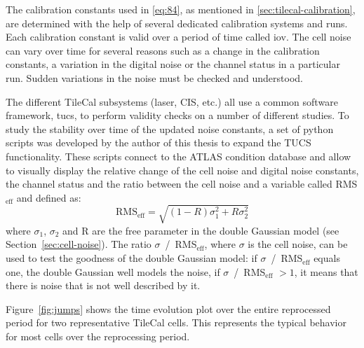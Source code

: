 The calibration constants used in \cref{eq:84}, as mentioned in
\cref{sec:tilecal-calibration}, are determined with the help of several
dedicated calibration systems and runs. Each calibration constant is valid over
a period of time called \gls{iov}. The cell noise can vary over time for several
reasons such as a change in the calibration constants, a variation in the
digital noise or the channel status in a particular run. Sudden variations in
the noise must be checked and understood.

The different TileCal subsystems (laser, CIS, etc.) all use a common software
framework, \gls{tucs}, to perform validity checks on a number of different
studies. To study the stability over time of the updated noise constants, a set
of python scripts was developed by the author of this thesis to expand the TUCS
functionality. These scripts connect to the ATLAS condition database and allow
to visually display the relative change of the cell noise and digital noise
constants, the channel status and the ratio between the cell noise and a
variable called RMS$_\text{eff}$ and defined as:
\begin{equation}
  \label{eq:87}
  \text{RMS}_{\text{eff}} = \sqrt{(1 - R) \sigma_1^2 + R \sigma_2^2}
\end{equation}
where $\sigma_1$, $\sigma_2$ and R are the free parameter in the double Gaussian
model (see Section~\ref{sec:cell-noise}).  The ratio
$\sigma$~/~RMS$_\text{eff}$, where $\sigma$ is the cell noise, can be used to
test the goodness of the double Gaussian model: if $\sigma$~/~RMS$_\text{eff}$
equals one, the double Gaussian well models the noise, if
$\sigma$~/~RMS$_\text{eff}$ $> 1$, it means that there is noise that is not well
described by it.

Figure~\ref{fig:jumps} shows the time evolution plot over the entire reprocessed
period for two representative TileCal cells. This represents the typical
behavior for most cells over the reprocessing period.

